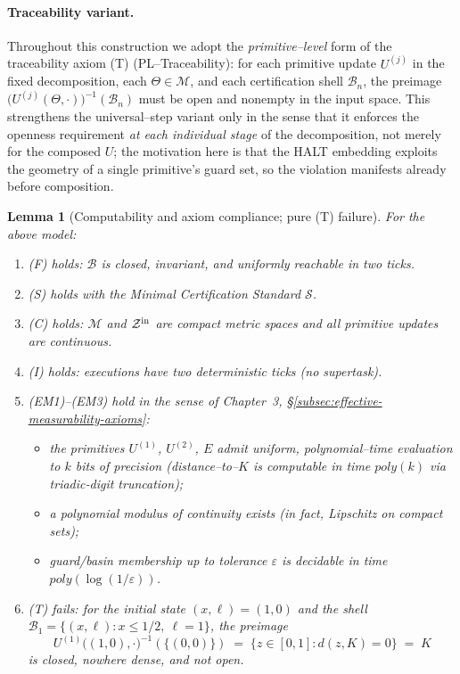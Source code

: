 \documentclass[12pt]{article}
\theoremstyle{definition}
\theoremstyle{plain}
\newtheorem{lemma}{Lemma}[section]
\begin{document}
\paragraph{Traceability variant.}
Throughout this construction we adopt the \emph{primitive–level} form of the traceability axiom \textup{(T)} (PL–Traceability): for each primitive update $U^{(j)}$ in the fixed decomposition, each $\Theta\in\mathcal M$, and each certification shell $\mathcal B_n$, the preimage $\big(U^{(j)}(\Theta,\cdot)\big)^{-1}(\mathcal B_n)$ must be open and nonempty in the input space. 
This strengthens the universal–step variant only in the sense that it enforces the openness requirement \emph{at each individual stage} of the decomposition, not merely for the composed $U$; the motivation here is that the HALT embedding exploits the geometry of a single primitive’s guard set, so the violation manifests already before composition.


\begin{lemma}[Computability and axiom compliance; pure (T) failure]
\label{lem:pure-T-compliance}
For the above model:
\begin{enumerate}[label=(\roman*), itemsep=4pt]
  \item \textup{(F)} holds: \(\mathcal B\) is closed, invariant, and uniformly reachable in two ticks.
  \item \textup{(S)} holds with the Minimal Certification Standard \(\mathcal S\).
  \item \textup{(C)} holds: \(\mathcal M\) and \(\mathcal Z^{\rm in}\) are compact metric spaces and all primitive updates are continuous.
  \item \textup{(I)} holds: executions have two deterministic ticks (no supertask).
  \item \textup{(EM1)}–\textup{(EM3)} hold in the sense of Chapter~3, \S\ref{subsec:effective-measurability-axioms}:
        \begin{itemize}
          \item the primitives \(U^{(1)}\), \(U^{(2)}\), \(E\) admit uniform, polynomial–time evaluation to \(k\) bits of precision (distance–to–\(K\) is computable in time \(poly(k)\) via triadic‐digit truncation);
          \item a polynomial modulus of continuity exists (in fact, Lipschitz on compact sets);
          \item guard/basin membership up to tolerance \(\varepsilon\) is decidable in time \(poly(\log(1/\varepsilon))\).
        \end{itemize}
  \item \textup{(T)} fails: for the initial state \((x,\ell)=(1,0)\) and the shell \(\mathcal B_1=\{(x,\ell): x\le1/2,\ \ell=1\}\), the preimage
  \[
     U^{(1)}\bigl((1,0),\cdot\bigr)^{-1}(\{(0,0)\})
     \;=\; \{z\in[0,1]: d(z,K)=0\}
     \;=\; K
  \]
  is closed, nowhere dense, and \emph{not} open.
\end{enumerate}
\end{lemma}
\end{document}
